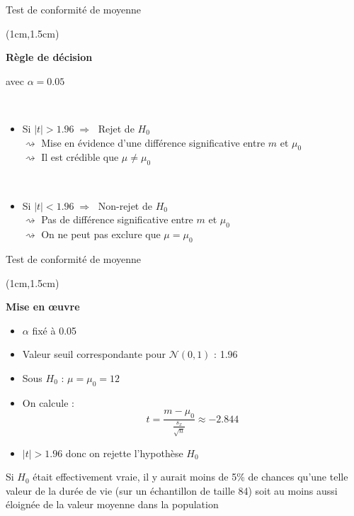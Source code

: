 \documentclass{beamer}
\begin{document}
\begin{frame}{Test de conformité de moyenne}
\begin{textblock*}{\textwidth}(1cm,1.5cm)

\begin{center}{\bf \Large Règle de décision} \end{center}

\begin{center}{avec $\alpha = 0.05$} \end{center}

\
\begin{itemize}
\item Si $|t| > 1.96 \; \Rightarrow \; $ Rejet de $H_0$ \\

$\rightsquigarrow$ Mise en évidence d'une différence significative entre $m$ et $\mu_0$ \\
$\rightsquigarrow$ Il est crédible que $\mu\neq\mu_0$

\
\item Si $|t| < 1.96 \; \Rightarrow \; $ Non-rejet de $H_0$ \\

$\rightsquigarrow$ Pas de différence significative entre $m$ et $\mu_0$ \\
$\rightsquigarrow$ On ne peut pas exclure que $\mu = \mu_0$

\end{itemize}

\end{textblock*}

\end{frame}



\begin{frame}{Test de conformité de moyenne}
\begin{textblock*}{\textwidth}(1cm,1.5cm)

\begin{center}{\bf \Large Mise en œuvre} \end{center}

\begin{itemize}
\item $\alpha$ fixé à 0.05 
\item Valeur seuil correspondante pour $\mathcal{N}(0,1)$ : 1.96
\item Sous $H_0$ : $\mu=\mu_0=12$
\item On calcule :
$$t=\frac{m-\mu_0}{\frac{s_x}{\sqrt{n}}} \approx -2.844$$
\item  $|t|>1.96$ donc on rejette l'hypothèse $H_0$
\end{itemize}

Si $H_0$ était effectivement vraie, il y aurait moins de 5\% de chances qu'une telle valeur de la durée de vie (sur un échantillon de taille 84) soit au moins aussi éloignée de la valeur moyenne dans la population

\end{textblock*}

\end{frame}
\end{document}
